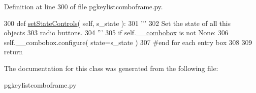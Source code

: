 Definition at line 300 of file pgkeylistcomboframe.\+py.


\begin{DoxyCode}
300     \textcolor{keyword}{def }\hyperlink{classnegui_1_1pgkeylistcomboframe_1_1KeyListComboFrame_a2b670cd4d4a38d03ae90df2786f076cb}{setStateControls}( self, s\_state ):
301         \textcolor{stringliteral}{'''}
302 \textcolor{stringliteral}{        Set the state of all this objects}
303 \textcolor{stringliteral}{        radio buttons.}
304 \textcolor{stringliteral}{        '''}
305         \textcolor{keywordflow}{if} self.\hyperlink{classnegui_1_1pgkeylistcomboframe_1_1KeyListComboFrame_a3595d0d35c1ac87adfd5f0b1f0dbf5ca}{\_\_combobox} \textcolor{keywordflow}{is} \textcolor{keywordflow}{not} \textcolor{keywordtype}{None}:
306             self.\_\_combobox.configure( state=s\_state )
307         \textcolor{comment}{#end for each entry box}
308 
309         \textcolor{keywordflow}{return}
\end{DoxyCode}


The documentation for this class was generated from the following file\+:\begin{DoxyCompactItemize}
\item 
pgkeylistcomboframe.\+py\end{DoxyCompactItemize}
